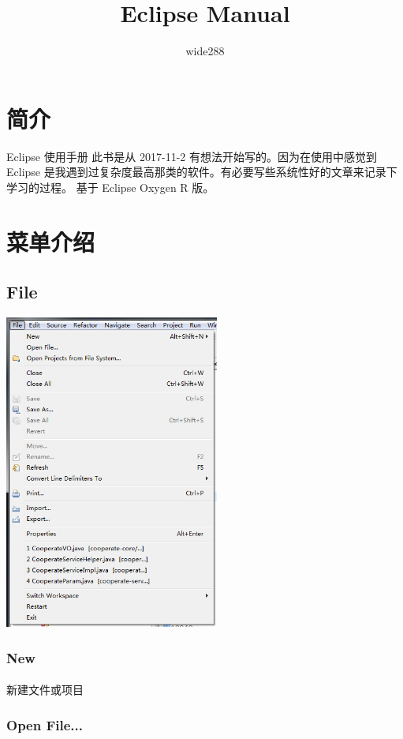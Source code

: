 \documentclass[UTF8]{article}
\author {wide288}
\title {Eclipse Manual}
\begin{document}
  \maketitle
    \section{简介}
    Eclipse 使用手册
    此书是从 2017-11-2 有想法开始写的。因为在使用中感觉到 Eclipse 是我遇到过复杂度最高那类的软件。有必要写些系统性好的文章来记录下学习的过程。
    基于 Eclipse Oxygen R 版。
    \section{菜单介绍}
        \subsection{File}
            \begin{center} %
              \includegraphics[width=200pt]{images/menu-file.png} %
            \end{center}
            \subsubsection{New}
              \paragraph{} 新建文件或项目
            \subsubsection{Open File...}
\end{document}
